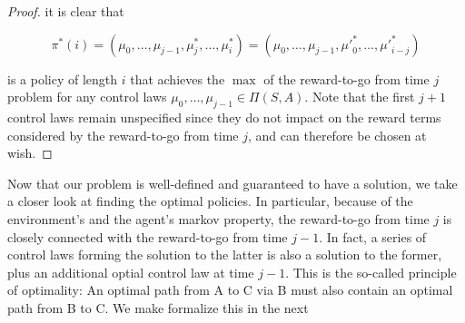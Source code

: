 \documentclass[11pt]{article} %
\begin{document}
\begin{proof}
it is clear that 

\begin{equation}
	\pi^*(i) = (\mu_0,\dots,\mu_{j-1},\mu^*_j,\dots,\mu^*_i) = (\mu_0,\dots,\mu_{j-1},{\mu'}^*_0,\dots,{\mu'}^*_{i-j})
\end{equation}

is a policy of length $i$ that achieves the $\max$ of the reward-to-go from time $j$ problem for any control laws $\mu_0,\dots,\mu_{j-1} \in \Pi(S,A)$. Note that the first $j+1$ control laws remain unspecified since they do not impact on the reward terms considered by the reward-to-go from time $j$, and can therefore be chosen at wish.

\end{proof}

Now that our problem is well-defined and guaranteed to have a solution, we take a closer look at finding the optimal policies. In particular, because of the environment's and the agent's markov property, the reward-to-go from time $j$ is closely connected with the reward-to-go from time $j-1$. In fact, a series of control laws forming the solution to the latter is also a solution to the former, plus an additional optial control law at time $j-1$. This is the so-called principle of optimality: An optimal path from A to C via B must also contain an optimal path from B to C. We make formalize this in the next
\end{document}
